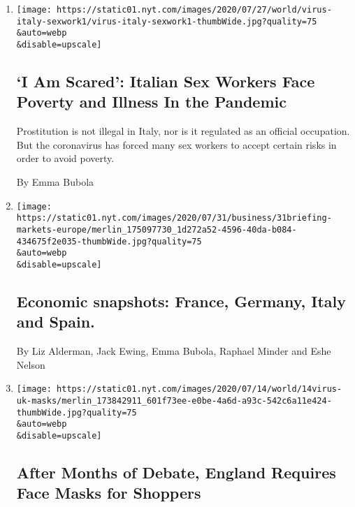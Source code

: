 \begin{enumerate}
\def\labelenumi{\arabic{enumi}.}
\item
  \href{/2020/08/03/world/europe/italy-coronavirus-prostitution-sex-work.html}{}

  \texttt{[image: https://static01.nyt.com/images/2020/07/27/world/virus-italy-sexwork1/virus-italy-sexwork1-thumbWide.jpg?quality=75\\\&auto=webp\\\&disable=upscale]}

  \hypertarget{i-am-scared-italian-sex-workers-face-poverty-and-illness-in-the-pandemic}{%
  \subsection{`I Am Scared': Italian Sex Workers Face Poverty and
  Illness In the
  Pandemic}\label{i-am-scared-italian-sex-workers-face-poverty-and-illness-in-the-pandemic}}

  Prostitution is not illegal in Italy, nor is it regulated as an
  official occupation. But the coronavirus has forced many sex workers
  to accept certain risks in order to avoid poverty.

  By Emma Bubola
\item
  \href{/live/2020/07/31/business/stock-market-today-coronavirus/economic-snapshots-france-germany-italy-and-spain}{}

  \texttt{[image: https://static01.nyt.com/images/2020/07/31/business/31briefing-markets-europe/merlin\_175097730\_1d272a52-4596-40da-b084-434675f2e035-thumbWide.jpg?quality=75\\\&auto=webp\\\&disable=upscale]}

  \hypertarget{economic-snapshots-france-germany-italy-and-spain}{%
  \subsection{Economic snapshots: France, Germany, Italy and
  Spain.}\label{economic-snapshots-france-germany-italy-and-spain}}

  By Liz Alderman, Jack Ewing, Emma Bubola, Raphael Minder and Eshe
  Nelson
\item
  \href{/2020/07/14/world/europe/uk-coronavirus-masks-mandate.html}{}

  \texttt{[image: https://static01.nyt.com/images/2020/07/14/world/14virus-uk-masks/merlin\_173842911\_601f73ee-e0be-4a6d-a93c-542c6a11e424-thumbWide.jpg?quality=75\\\&auto=webp\\\&disable=upscale]}

  \hypertarget{after-months-of-debate-england-requires-face-masks-for-shoppers}{%
  \subsection{After Months of Debate, England Requires Face Masks for
  Shoppers}\label{after-months-of-debate-england-requires-face-masks-for-shoppers}}


\end{enumerate}
